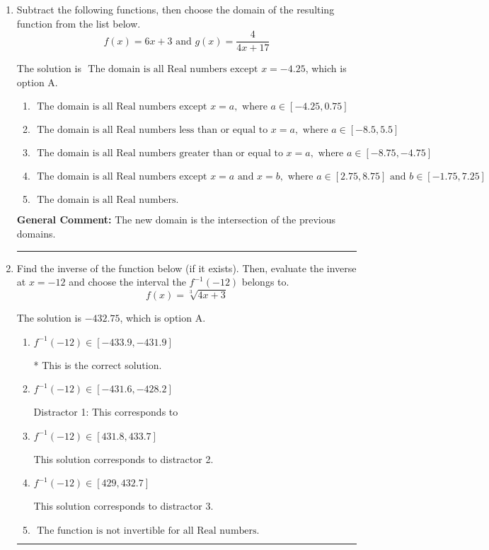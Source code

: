 \documentclass{extbook}[14pt]
\newcommand{\litem}[1]{\item #1

\rule{\textwidth}{0.4pt}}
\begin{document}
\begin{enumerate}\litem{
Subtract the following functions, then choose the domain of the resulting function from the list below.
\[ f(x) = 6x + 3 \text{ and } g(x) = \frac{4}{4x+17} \]

The solution is \( \text{ The domain is all Real numbers except } x = -4.25 \), which is option A.\begin{enumerate}[label=\Alph*.]
\item \( \text{ The domain is all Real numbers except } x = a, \text{ where } a \in [-4.25, 0.75] \)


\item \( \text{ The domain is all Real numbers less than or equal to } x = a, \text{ where } a \in [-8.5, 5.5] \)


\item \( \text{ The domain is all Real numbers greater than or equal to } x = a, \text{ where } a \in [-8.75, -4.75] \)


\item \( \text{ The domain is all Real numbers except } x = a \text{ and } x = b, \text{ where } a \in [2.75, 8.75] \text{ and } b \in [-1.75, 7.25] \)


\item \( \text{ The domain is all Real numbers. } \)


\end{enumerate}

\textbf{General Comment:} The new domain is the intersection of the previous domains.
}
\litem{
Find the inverse of the function below (if it exists). Then, evaluate the inverse at $x = -12$ and choose the interval the $f^{-1}(-12)$ belongs to.
\[ f(x) = \sqrt[3]{4 x + 3} \]

The solution is \( -432.75 \), which is option A.\begin{enumerate}[label=\Alph*.]
\item \( f^{-1}(-12) \in [-433.9, -431.9] \)

* This is the correct solution.
\item \( f^{-1}(-12) \in [-431.6, -428.2] \)

 Distractor 1: This corresponds to 
\item \( f^{-1}(-12) \in [431.8, 433.7] \)

 This solution corresponds to distractor 2.
\item \( f^{-1}(-12) \in [429, 432.7] \)

 This solution corresponds to distractor 3.
\item \( \text{ The function is not invertible for all Real numbers. } \)


\end{enumerate}}
\end{enumerate}
\end{document}
